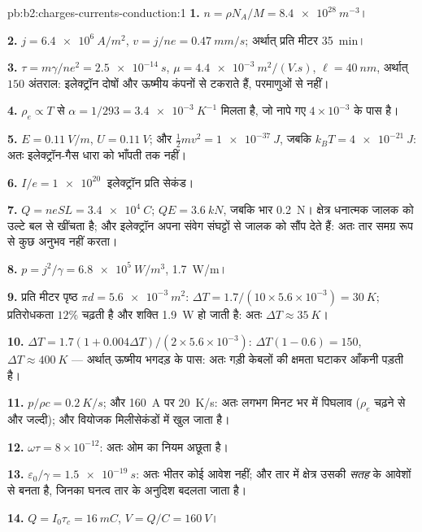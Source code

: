 \begin{solution}{pb:b2:charges-currents-conduction:1}
\textbf{1.} $n = \rho N_A/M = \qty{8.4e28}{m^{-3}}$।

\textbf{2.} $j = \qty{6.4e6}{A/m^2}$, $v = j/ne = \qty{0.47}{mm/s}$; अर्थात् प्रति मीटर \qty{35}{min}।

\textbf{3.} $\tau = m\gamma/ne^2 = \qty{2.5e-14}{s}$, $\mu = \qty{4.4e-3}{m^2/(V.s)}$, $\ell =
\qty{40}{nm}$, अर्थात् $150$ अंतराल: इलेक्ट्रॉन दोषों और ऊष्मीय कंपनों से
टकराते हैं, परमाणुओं से नहीं।

\textbf{4.} $\rho_e \propto T$ से $\alpha = 1/293 = \qty{3.4e-3}{K^{-1}}$ मिलता है, जो नापे गए
$4 \times 10^{-3}$ के पास है।

\textbf{5.} $E = \qty{0.11}{V/m}$, $U = \qty{0.11}{V}$; और $\tfrac12mv^2 = \qty{1e-37}{J}$, जबकि
$k_BT = \qty{4e-21}{J}$: अतः इलेक्ट्रॉन-गैस धारा को भाँपती तक नहीं।

\textbf{6.} $I/e = \qty{1e20}{}$ इलेक्ट्रॉन प्रति सेकंड।

\textbf{7.} $Q = neSL = \qty{3.4e4}{C}$; $QE = \qty{3.6}{kN}$, जबकि भार
\qty{0.2}{N}। क्षेत्र धनात्मक जालक को उल्टे बल से खींचता है; और
इलेक्ट्रॉन अपना संवेग संघट्टों से जालक को सौंप देते हैं:
अतः तार समग्र रूप से कुछ अनुभव नहीं करता।

\textbf{8.} $p = j^2/\gamma = \qty{6.8e5}{W/m^3}$, \qty{1.7}{W/m}।

\textbf{9.} प्रति मीटर पृष्ठ $\pi d = \qty{5.6e-3}{m^2}$: $\Delta T = 1.7/(10 \times 5.6 \times
10^{-3}) = \qty{30}{K}$; प्रतिरोधकता $12\%$ चढ़ती है और शक्ति \qty{1.9}{W} हो जाती है:
अतः $\Delta T \approx \qty{35}{K}$।

\textbf{10.} $\Delta T = 1.7(1 + 0.004\Delta T)/(2 \times 5.6 \times 10^{-3})$: $\Delta T(1 - 0.6) = 150$,
$\Delta T \approx \qty{400}{K}$ --- अर्थात् ऊष्मीय भगदड़ के पास: अतः गड़ी केबलों की
क्षमता घटाकर आँकनी पड़ती है।

\textbf{11.} $p/\rho c = \qty{0.2}{K/s}$; और \qty{160}{A} पर \qty{20}{K/s}: अतः लगभग
मिनट भर में पिघलाव ($\rho_e$ चढ़ने से और जल्दी); और वियोजक मिलीसेकंडों में खुल जाता है।

\textbf{12.} $\omega\tau = 8 \times 10^{-12}$: अतः ओम का नियम अछूता है।

\textbf{13.} $\varepsilon_0/\gamma = \qty{1.5e-19}{s}$: अतः भीतर कोई आवेश नहीं; और तार में
क्षेत्र उसकी \emph{सतह} के आवेशों से बनता है, जिनका घनत्व
तार के अनुदिश बदलता जाता है।

\textbf{14.} $Q = I_0\tau_c = \qty{16}{mC}$, $V = Q/C = \qty{160}{V}$।


\end{solution}
